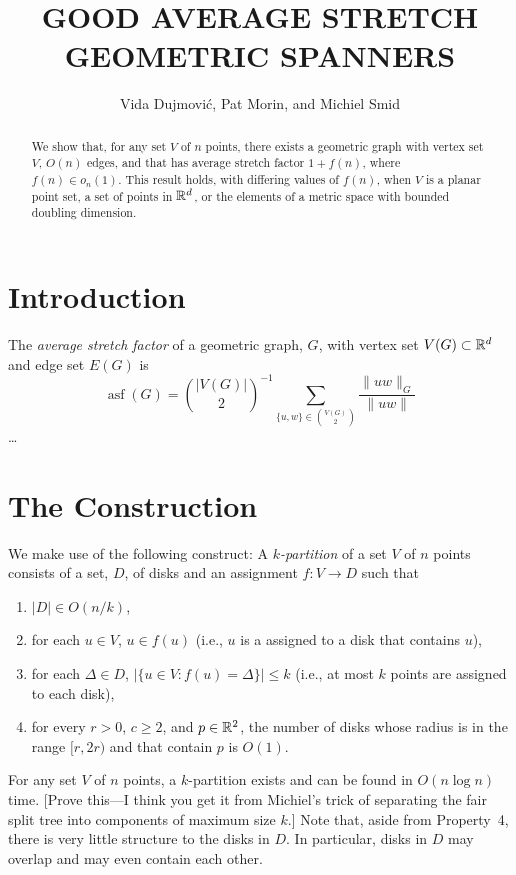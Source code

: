 \documentclass{patmorin}
\title{\MakeUppercase{Good Average Stretch Geometric Spanners}}
\author{Vida Dujmovi\'c, Pat Morin, and Michiel Smid}
\DeclareMathOperator{\asf}{asf}
\begin{document}
\begin{titlepage}
\maketitle
{}

\begin{abstract}
  We show that, for any set $V$ of $n$ points, there exists a geometric
  graph with vertex set $V$, $O(n)$ edges, and that has average stretch
  factor $1+f(n)$, where $f(n)\in o_n(1)$.  This result holds, with
  differing values of $f(n)$, when $V$ is a planar point set, a set
  of points in $\mathbb{R}^d$, or the elements of a metric space with bounded
  doubling dimension.
\end{abstract}

\end{titlepage}

\section{Introduction}

The \emph{average stretch factor} of a geometric graph, $G$, with vertex
set $V(G)\subset \mathbb{R}^d$ and edge set $E(G)$ is
\[
    \asf(G) = \binom{|V(G)|}{2}^{-1}\sum_{\{u,w\}\in\binom{V(G)}{2}}\frac{\|uw\|_G}{\|uw\|}
\]
\ldots

\section{The Construction}

We make use of the following construct:  A \emph{$k$-partition} of a
set $V$ of $n$ points consists of a set, $D$,
of disks and an assignment $f:V\to D$ such that
\begin{enumerate}
  \item $|D|\in O(n/k)$,
  \item for each $u\in V$, $u\in f(u)$ (i.e., $u$ is a assigned to a
    disk that contains $u$),
  \item for each $\Delta\in D$, $|\{u\in V: f(u)=\Delta\}|\le k$ (i.e.,
   at most $k$ points are assigned to each disk),
  \item for every $r> 0$, $c\ge 2$, and $p\in\mathbb{R}^2$, the number of disks
   whose radius is in the range $[r,2r)$ and that contain $p$ is $O(1)$.
\end{enumerate}
For any set $V$ of $n$ points, a $k$-partition exists and can be found in
$O(n\log n)$ time. [Prove this---I think you get it from Michiel's trick
of separating the fair split tree into components of maximum size $k$.]
Note that, aside from Property~4, there is very little structure to
the disks in $D$. In particular, disks in $D$ may overlap and may
even contain each other.
\end{document}
